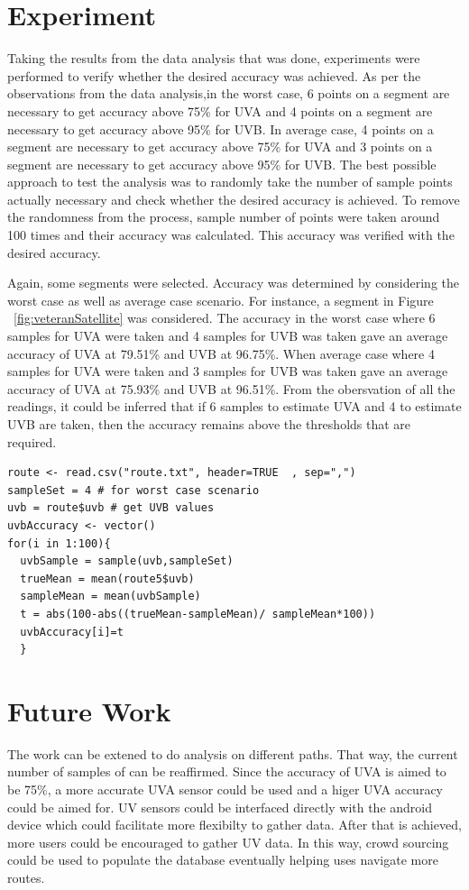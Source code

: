\documentclass[10pt]{sigplan-proc-varsize}
\begin{document}
\section{Experiment}
Taking the results from the data analysis that was done, experiments were performed to verify whether the desired accuracy was achieved. As per the observations from the data analysis,in the worst case, 6 points on a segment are necessary to get accuracy above 75\% for UVA and 4 points on a segment are necessary to get accuracy above 95\% for UVB.
In average case, 4 points on a segment are necessary to get accuracy above 75\% for UVA and  3 points on a segment are necessary to get accuracy above 95\% for UVB. The best possible approach to test the analysis was to randomly take the number of sample points actually necessary and check whether the desired accuracy is achieved. To remove the randomness from the process, sample number of points were taken around 100 times and their accuracy was calculated. This accuracy was verified with the desired accuracy. 

Again, some segments were selected. Accuracy was determined by considering the worst case as well as average case scenario. For instance, a segment in Figure ~\ref{fig:veteranSatellite} was considered. The accuracy in the worst case where 6 samples for UVA were taken and 4 samples for UVB was taken gave an average accuracy of UVA at 79.51\% and UVB at 96.75\%. When average case where 4 samples for UVA were taken and 3 samples for UVB was taken gave an average accuracy of UVA at 75.93\% and UVB at 96.51\%. From the obersvation of all the readings, it could be inferred that if 6 samples to estimate UVA and 4 to estimate UVB are taken, then the accuracy remains above the thresholds that are required.
\lstset{ tabsize=4,      caption=R Code for verifying accuracy,breaklines=true,
        frame=single}
\begin{lstlisting}
route <- read.csv("route.txt", header=TRUE  , sep=",")
sampleSet = 4 # for worst case scenario
uvb = route$uvb # get UVB values
uvbAccuracy <- vector()
for(i in 1:100){
  uvbSample = sample(uvb,sampleSet)
  trueMean = mean(route5$uvb)
  sampleMean = mean(uvbSample)
  t = abs(100-abs((trueMean-sampleMean)/ sampleMean*100))
  uvbAccuracy[i]=t
  }
\end{lstlisting}

\section{Future Work}
The work can be extened to do analysis on different paths. That way, the current number of samples of can be reaffirmed. Since the accuracy of UVA is aimed to be 75\%, a more accurate UVA sensor could be used and a higer UVA accuracy could be aimed for. UV sensors could be interfaced directly with the android device which could facilitate more flexibilty to gather data. After that is achieved, more users could be encouraged to gather UV data. In this way, crowd sourcing could be used to populate the database eventually helping uses navigate more routes.
\end{document}
